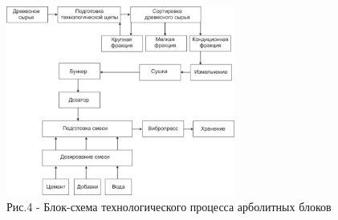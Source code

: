 \begin{figure}[H]
	\centering
	\includegraphics[width=0.67\textwidth]{media/chem/image5}
	\caption*{Рис.4 - Блок-схема технологического процесса арболитных блоков}
\end{figure}

